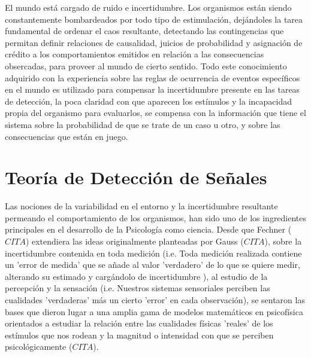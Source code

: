 El mundo está cargado de ruido e incertidumbre. Los organismos están siendo constantemente bombardeados por todo tipo de estimulación, dejándoles la tarea fundamental de ordenar el caos resultante, detectando las contingencias que permitan definir relaciones de causalidad, juicios de probabilidad y asignación de crédito a los comportamientos emitidos en relación a las consecuencias obsercadas, para proveer al mundo de cierto sentido. Todo este conocimiento adquirido con la experiencia sobre las reglas de ocurrencia de eventos específicos en el mundo es utilizado para compensar la incertidumbre presente en las tareas de detección, la poca claridad con que aparecen los estímulos y la incapacidad propia del organismo para evaluarlos, se compensa con la información que tiene el sistema sobre la probabilidad de que se trate de un caso u otro, y sobre las consecuencias que están en juego.\\ 

\section{Teoría de Detección de Señales}


Las nociones de la variabilidad en el entorno y la incertidumbre resultante permeando el comportamiento de los organismos, han sido uno de los ingredientes principales en el desarrollo de la Psicología como ciencia. Desde que Fechner ($CITA$) extendiera las ideas originalmente planteadas por Gauss ($CITA$), sobre la incertidumbre contenida en toda medición (i.e. Toda medición realizada contiene un 'error de medida' que se añade al valor 'verdadero' de lo que se quiere medir, alterando su estimado y cargándolo de incertidumbre ), al estudio de la percepción y la sensación (i.e. Nuestros sistemas sensoriales perciben las cualidades 'verdaderas' más un cierto 'error' en cada observación), se sentaron las bases que dieron lugar a una amplia gama de modelos matemáticos en psicofísica orientados a estudiar la relación entre las cualidades físicas 'reales' de los estímulos que nos rodean y la magnitud o intensidad con que se perciben psicológicamente ($CITA$).\\

